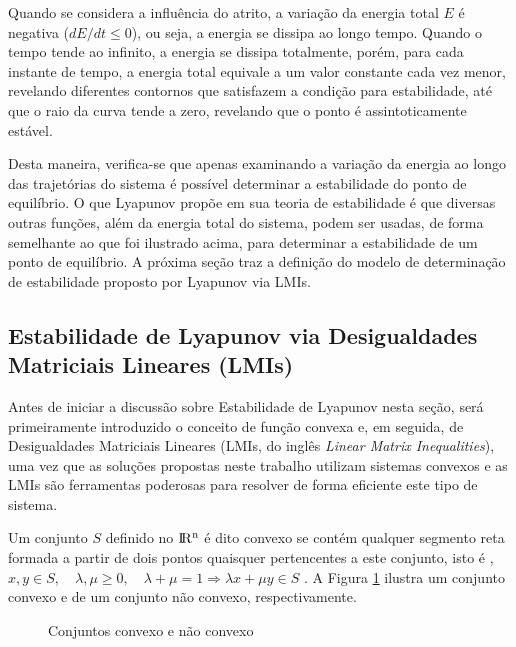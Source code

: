 Quando se considera a influência do atrito, a variação da energia total $E$ é negativa ($dE/dt \leq 0$), ou seja, a energia se dissipa ao longo tempo. Quando o tempo tende ao infinito, a energia se dissipa totalmente, porém, para cada instante de tempo, a energia total equivale a um valor constante cada vez menor, revelando diferentes contornos que satisfazem a condição para estabilidade, até que o raio da curva tende a zero, revelando que o ponto é assintoticamente estável.

Desta maneira, verifica-se que apenas examinando a variação da energia ao longo das trajetórias do sistema é possível determinar a estabilidade do ponto de equilíbrio. O que Lyapunov propõe em sua teoria de estabilidade é que diversas outras funções, além da energia total do sistema, podem ser usadas, de forma semelhante ao que foi ilustrado acima, para determinar a estabilidade de um ponto de equilíbrio. A próxima seção traz a definição do modelo de determinação de estabilidade proposto por Lyapunov via LMIs.

\subsection{Estabilidade de Lyapunov via Desigualdades Matriciais Lineares (LMIs)}

Antes de iniciar a discussão sobre Estabilidade de Lyapunov nesta seção, será primeiramente introduzido o conceito de função convexa e, em seguida, de Desigualdades Matriciais Lineares (LMIs, do inglês \textit{Linear Matrix Inequalities}), uma vez que as soluções propostas neste trabalho utilizam sistemas convexos e as LMIs são ferramentas poderosas para resolver de forma eficiente este tipo de sistema.

Um conjunto $S$ definido no $\rm I\!R^{n}$ é dito convexo se contém qualquer segmento reta formada a partir de dois pontos quaisquer pertencentes a este conjunto, isto é , $x, y \in S,\quad\lambda,\mu\geq0,\quad\lambda+\mu=1\Rightarrow\lambda x +\mu y\in S$ \cite{inproc:hin:2004}. A Figura \ref{fig:sets_exmples} ilustra um conjunto convexo e de um conjunto não convexo, respectivamente.

\begin{figure}[htbp]
	\centering
	\qquad
	\caption{Conjuntos convexo e não convexo}
	\label{fig:sets_exmples}
\end{figure}

